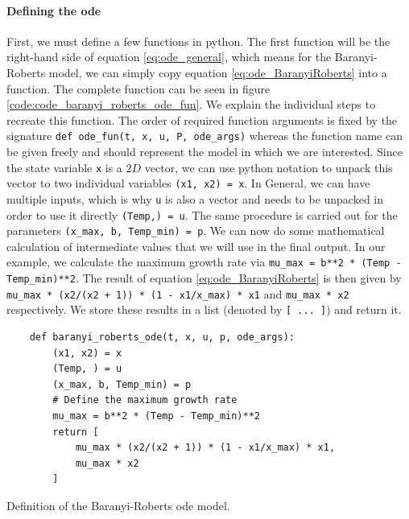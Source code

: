 \documentclass[10pt,A4paper]{article}
\begin{document}
\paragraph{Defining the \acs{ode}} First, we must define a few functions in python.
The first function will be the right-hand side of equation \ref{eq:ode_general}, which means for the Baranyi-Roberts model, we can simply copy equation \ref{eq:ode_BaranyiRoberts} into a function.
The complete function can be seen in figure \ref{code:code_baranyi_roberts_ode_fun}.
We explain the individual steps to recreate this function.
The order of required function arguments is fixed by the signature
\texttt{def ode_fun(t, x, u, P, ode_args)} whereas the function name can be given freely and should represent the model in which we are interested.
Since the state variable \texttt{x} is a $2D$ vector, we can use python notation to unpack this vector to two individual variables
\texttt{(x1, x2) = x}.
In General, we can have multiple inputs, which is why \texttt{u} is also a vector and needs to be unpacked in order to use it directly \texttt{(Temp,) = u}.
The same procedure is carried out for the parameters \texttt{(x_max, b, Temp_min) = p}.
We can now do some mathematical calculation of intermediate values that we will use in the final output.
In our example, we calculate the maximum growth rate via \texttt{mu_max = b**2 * (Temp - Temp_min)**2}.
The result of equation \ref{eq:ode_BaranyiRoberts} is then given by \texttt{mu_max * (x2/(x2 + 1)) * (1 - x1/x_max) * x1} and 
\texttt{mu_max * x2} respectively.
We store these results in a list (denoted by \texttt{[ ... ]}) and return it.
\begin{code}[h]
    \begin{verbatim}
    def baranyi_roberts_ode(t, x, u, p, ode_args):
        (x1, x2) = x
        (Temp, ) = u
        (x_max, b, Temp_min) = p
        # Define the maximum growth rate
        mu_max = b**2 * (Temp - Temp_min)**2
        return [
            mu_max * (x2/(x2 + 1)) * (1 - x1/x_max) * x1,
            mu_max * x2
        ]
    \end{verbatim}
    \caption{Definition of the Baranyi-Roberts \ac{ode} model.}
    \label{code:code_baranyi_roberts_ode_fun}
\end{code}
%
\end{document}

